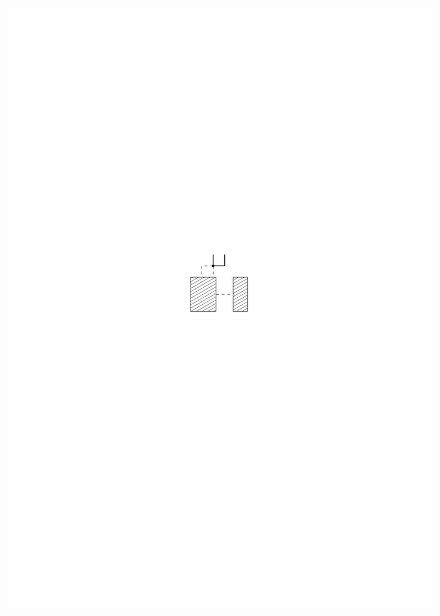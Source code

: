 \documentclass[a4paper]{scrreprt}
\theoremstyle{definition}
\begin{document}
\begin{figure}[h]
            {\includegraphics[scale=.8]{oc3_embed/outgoing/outdeg2}}
        \quad

\end{figure}
\end{document}
